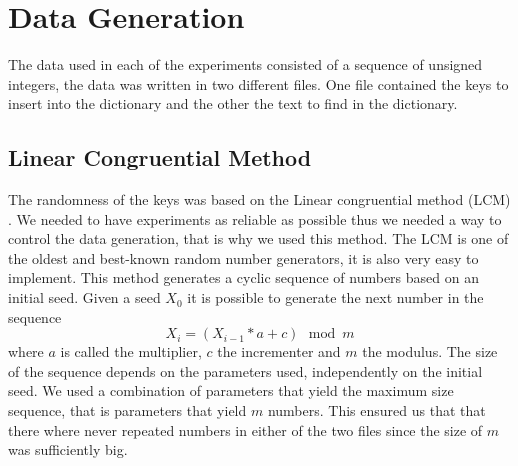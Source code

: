 \documentclass{article}
\begin{document}
    
    
    \section{Data Generation}
        The data used in each of the experiments consisted of a sequence of unsigned integers,  
        the data was written in two different files. One file contained the keys to insert into the dictionary and the other the text to find in the dictionary. 
       
        \subsection*{Linear Congruential Method}
        The randomness of the keys was based on the Linear congruential method (LCM) \cite{BOOK:2}. 
        We needed to have experiments as reliable as possible thus we needed a way to control the data generation, 
        that is why we used this method. The LCM is one of the oldest and best-known random number generators, 
        it is also very easy to implement. This method generates a cyclic sequence of numbers based on an initial seed. 
        Given a seed $X_0$ it is possible to generate the next number in the sequence 
        \begin{equation}
        X_i = (X_{i-1} * a + c) \, \bmod m
        \end{equation}
         where $a$ is called the multiplier, $c$ the incrementer and $m$ the modulus. 
         The size of the sequence depends on the parameters used, independently on the initial seed.
          We used a combination of parameters that yield the maximum size sequence, that is parameters that yield $m$ numbers.  
          This ensured us that that there where never repeated numbers in either of the two files since the size of $m$ was
          sufficiently big. 
          
           
\end{document}
